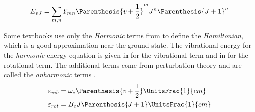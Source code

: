     \begin{equation}\label{eq:rotVibrationalDunhamEnergy}
        E_{vJ} = \sum_{m,n} Y_{mn}\Parenthesis{v + \frac{1}{2}}^m
        J^n\Parenthesis{J + 1}^n
    \end{equation}

    Some textbooks \cite{Harris2008} use only the
    \textit{Harmonic} terms from  to
    define the \textit{Hamiltonian}, which
    is a good approximation near the ground state. The vibrational energy for
    the \textit{harmonic} energy equation is given in
     for the vibrational term and in
     for the rotational term. The additional terms
    come from perturbation theory and are called the \textit{anharmonic}
    terms \cite{Griffiths2018}.
    \begin{subequations}\label{eq:vibrationalRotationalEnergies}
        \begin{align}
            \varepsilon_{vib} &=
            \omega_e\Parenthesis{v + \frac{1}{2}} \UnitsFrac{1}{cm} \label{eq:vibrationalEnergy} \\
            \varepsilon_{rot} &= B_e J\Parenthesis{J+1} \UnitsFrac{1}{cm}\label{eq:rotationalEnergy}
        \end{align}
    \end{subequations}

